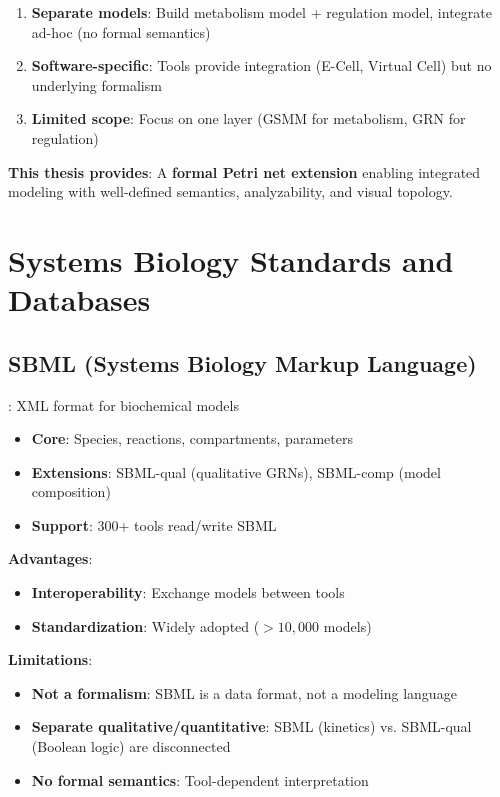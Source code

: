 \begin{enumerate}
    \item \textbf{Separate models}: Build metabolism model + regulation model, integrate ad-hoc (no formal semantics)
    \item \textbf{Software-specific}: Tools provide integration (E-Cell, Virtual Cell) but no underlying formalism
    \item \textbf{Limited scope}: Focus on one layer (GSMM for metabolism, GRN for regulation)
\end{enumerate}

\textbf{This thesis provides}: A \textbf{formal Petri net extension} enabling integrated modeling with well-defined semantics, analyzability, and visual topology.

\section{Systems Biology Standards and Databases}
\label{sec:standards-databases}

\subsection{SBML (Systems Biology Markup Language)}
\label{subsec:sbml}

\textbf{\citet{Hucka2003}}: XML format for biochemical models

\begin{itemize}
    \item \textbf{Core}: Species, reactions, compartments, parameters
    \item \textbf{Extensions}: SBML-qual (qualitative GRNs), SBML-comp (model composition)
    \item \textbf{Support}: 300+ tools read/write SBML
\end{itemize}

\textbf{Advantages}:

\begin{itemize}
    \item \textbf{Interoperability}: Exchange models between tools
    \item \textbf{Standardization}: Widely adopted ($>10,000$ models)
\end{itemize}

\textbf{Limitations}:

\begin{itemize}
    \item \textbf{Not a formalism}: SBML is a data format, not a modeling language
    \item \textbf{Separate qualitative/quantitative}: SBML (kinetics) vs. SBML-qual (Boolean logic) are disconnected
    \item \textbf{No formal semantics}: Tool-dependent interpretation
\end{itemize}

